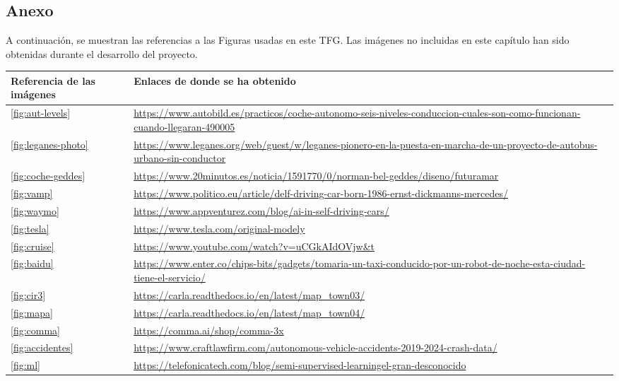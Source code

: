\begin{appendices}
\chapter{Anexo}  %
\label{cap:anexo}

A continuación, se muestran las referencias a las Figuras usadas en este \ac{TFG}. Las imágenes no incluidas en este capítulo han sido obtenidas durante el desarrollo del proyecto.\newline

\begin{tabular}{ | m{4cm} | m{10cm}| m{1cm} | }
    \hline
    \textbf{Referencia de las imágenes} & \textbf{Enlaces de donde se ha obtenido}  \\
    \hline
    \ref{fig:aut-levels} & \url{https://www.autobild.es/practicos/coche-autonomo-seis-niveles-conduccion-cuales-son-como-funcionan-cuando-llegaran-490005} \\ 
	\hline
	\ref{fig:leganes-photo} & \url{https://www.leganes.org/web/guest/w/leganes-pionero-en-la-puesta-en-marcha-de-un-proyecto-de-autobus-urbano-sin-conductor} \\
	\hline
	\ref{fig:coche-geddes} & \url{https://www.20minutos.es/noticia/1591770/0/norman-bel-geddes/diseno/futuramar} \\
	\hline
	\ref{fig:vamp} & \url{https://www.politico.eu/article/delf-driving-car-born-1986-ernst-dickmanns-mercedes/} \\
	\hline
	\ref{fig:waymo} & \url{https://www.appventurez.com/blog/ai-in-self-driving-cars/} \\
	\hline
	\ref{fig:tesla} & \url{https://www.tesla.com/original-modely} \\
	\hline
	\ref{fig:cruise} & \url{https://www.youtube.com/watch?v=uCGkAIdOVjw&t} \\
	\hline
	\ref{fig:baidu} & \url{https://www.enter.co/chips-bits/gadgets/tomaria-un-taxi-conducido-por-un-robot-de-noche-esta-ciudad-tiene-el-servicio/} \\
	\hline
	\ref{fig:cir3} & \url{https://carla.readthedocs.io/en/latest/map_town03/} \\
	\hline
	\ref{fig:mapa} & \url{https://carla.readthedocs.io/en/latest/map_town04/} \\
	\hline
	\ref{fig:comma} & \url{https://comma.ai/shop/comma-3x} \\
	\hline
	\ref{fig:accidentes} & \url{https://www.craftlawfirm.com/autonomous-vehicle-accidents-2019-2024-crash-data/} \\
	\hline
	\ref{fig:ml} & \url{https://telefonicatech.com/blog/semi-supervised-learningel-gran-desconocido} \\
\end{tabular}


\end{appendices}
